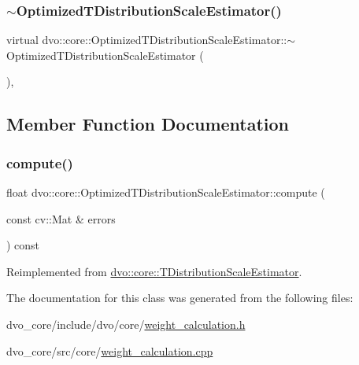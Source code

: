 \subsubsection{\texorpdfstring{$\sim$\+Optimized\+T\+Distribution\+Scale\+Estimator()}{~OptimizedTDistributionScaleEstimator()}}
{\footnotesize\ttfamily virtual dvo\+::core\+::\+Optimized\+T\+Distribution\+Scale\+Estimator\+::$\sim$\+Optimized\+T\+Distribution\+Scale\+Estimator (\begin{DoxyParamCaption}{ }\end{DoxyParamCaption})\hspace{0.3cm}{\ttfamily [inline]}, {\ttfamily [virtual]}}



\subsection{Member Function Documentation}
\mbox{\label{classdvo_1_1core_1_1_optimized_t_distribution_scale_estimator_ace9304a785bd16a6ef5cf4a52f3c6299}} 
\subsubsection{\texorpdfstring{compute()}{compute()}}
{\footnotesize\ttfamily float dvo\+::core\+::\+Optimized\+T\+Distribution\+Scale\+Estimator\+::compute (\begin{DoxyParamCaption}\item[{const cv\+::\+Mat \&}]{errors }\end{DoxyParamCaption}) const\hspace{0.3cm}{\ttfamily [virtual]}}



Reimplemented from \mbox{\hyperlink{classdvo_1_1core_1_1_t_distribution_scale_estimator_a0ed88ffeb9b71110e3ae69b681526bc4}{dvo\+::core\+::\+T\+Distribution\+Scale\+Estimator}}.



The documentation for this class was generated from the following files\+:\begin{DoxyCompactItemize}
\item 
dvo\+\_\+core/include/dvo/core/\mbox{\hyperlink{weight__calculation_8h}{weight\+\_\+calculation.\+h}}\item 
dvo\+\_\+core/src/core/\mbox{\hyperlink{weight__calculation_8cpp}{weight\+\_\+calculation.\+cpp}}\end{DoxyCompactItemize}
